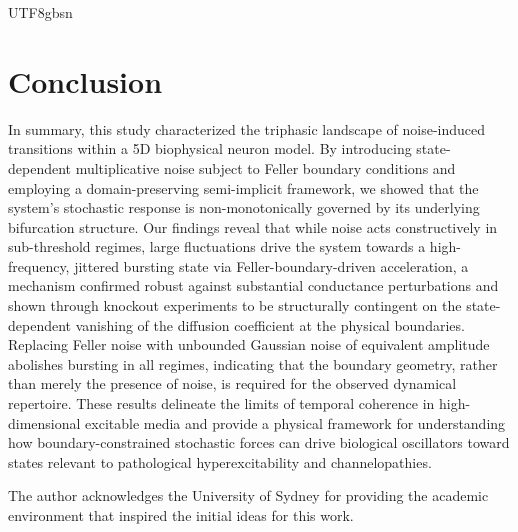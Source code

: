 ﻿\documentclass[reprint, amsmath, amssymb, aps, pre]{revtex4-2}
\begin{document}
\begin{CJK*}{UTF8}{gbsn}
\section{Conclusion}
\label{sec:conclusion}

In summary, this study characterized the triphasic landscape of noise-induced transitions within a 5D biophysical neuron model. By introducing state-dependent multiplicative noise subject to Feller boundary conditions and employing a domain-preserving semi-implicit framework, we showed that the system's stochastic response is non-monotonically governed by its underlying bifurcation structure. Our findings reveal that while noise acts constructively in sub-threshold regimes, large fluctuations drive the system towards a high-frequency, jittered bursting state via Feller-boundary-driven acceleration, a mechanism confirmed robust against substantial conductance perturbations and shown through knockout experiments to be structurally contingent on the state-dependent vanishing of the diffusion coefficient at the physical boundaries. Replacing Feller noise with unbounded Gaussian noise of equivalent amplitude abolishes bursting in all regimes, indicating that the boundary geometry, rather than merely the presence of noise, is required for the observed dynamical repertoire. These results delineate the limits of temporal coherence in high-dimensional excitable media and provide a physical framework for understanding how boundary-constrained stochastic forces can drive biological oscillators toward states relevant to pathological hyperexcitability and channelopathies.


\begin{acknowledgments}
The author acknowledges the University of Sydney for providing the academic environment that inspired the initial ideas for this work.
\end{acknowledgments}




 

     


\end{CJK*}
\end{document}
